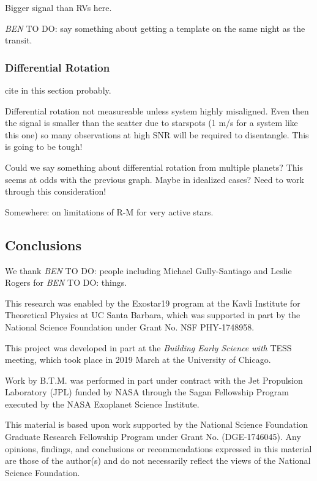 \documentclass[twocolumn]{aastex62}
\newcommand{\todo}[3]{{\color{#2} \emph{#1} TO DO: #3}}
\newcommand{\btmtodo}[1]{\todo{BEN}{blue}{#1}}
\begin{document}
Bigger signal than RVs here.


\btmtodo{say something about getting a template on the same night as the transit.}

\subsubsection{Differential Rotation}



cite \citet{Giminez06} in this section probably.


Differential rotation not measureable unless system highly misaligned. Even then the signal is smaller than the scatter due to starspots (1 m/s for a system like this one) so many observations at high SNR will be required to disentangle. This is going to be tough!

Could we say something about differential rotation from multiple planets? This seems at odds with the previous graph. Maybe in idealized cases? Need to work through this consideration!


Somewhere: \citet{Oshagh18} on limitations of R-M for very active stars.


\subsection{Conclusions}



\acknowledgements

We thank \btmtodo{people including Michael Gully-Santiago and Leslie Rogers} for \btmtodo{things}.


This research was enabled by the Exostar19 program at the Kavli Institute for Theoretical Physics at UC Santa Barbara, which was supported in part by the National Science Foundation under Grant No. NSF PHY-1748958.

This project was developed in part at the \textit{Building Early Science with} TESS meeting, which took place in 2019 March at the University of Chicago.

Work by B.T.M. was performed in part under contract with the Jet
Propulsion Laboratory (JPL) funded by NASA through
the Sagan Fellowship Program executed by the NASA
Exoplanet Science Institute.

This material is based upon work supported by the National Science Foundation Graduate Research Fellowship Program under Grant No. (DGE-1746045). Any opinions, findings, and conclusions or recommendations expressed in this material are those of the author(s) and do not necessarily reflect the views of the National Science Foundation.
\end{document}
